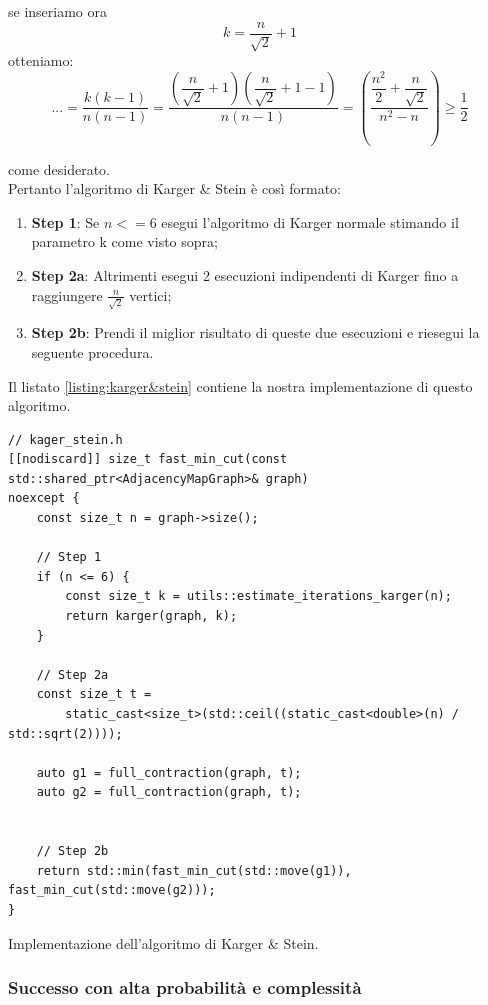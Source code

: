 \noindent se inseriamo ora $$ k = \dfrac{n}{\sqrt{2}} + 1$$ otteniamo:
$$ ... = \dfrac{k(k-1)}{n(n-1)} = \dfrac{(\dfrac{n}{\sqrt{2}} + 1) (\dfrac{n}{\sqrt{2}} + 1 - 1)}{n(n-1)} = (\dfrac{\dfrac{n^2}{2} + \dfrac{n}{\sqrt{2}}}{n^2 - n}) \geq \dfrac{1}{2}$$

\noindent come desiderato.\\

\noindent Pertanto l'algoritmo di Karger \& Stein è così formato:
\begin{enumerate}
    \item \textbf{Step 1}: Se $n <= 6$ esegui l'algoritmo di Karger normale stimando il parametro k come visto sopra;
    \item \textbf{Step 2a}: Altrimenti esegui 2 esecuzioni indipendenti di Karger fino a raggiungere $\frac{n}{\sqrt{2}}$ vertici;
    \item \textbf{Step 2b}: Prendi il miglior risultato di queste due esecuzioni e riesegui la seguente procedura.
\end{enumerate}

Il listato \ref{listing:karger&stein} contiene la nostra implementazione di questo algoritmo.


\begin{listing}[!ht]
\begin{verbatim}
// kager_stein.h
[[nodiscard]] size_t fast_min_cut(const std::shared_ptr<AdjacencyMapGraph>& graph)
noexcept {
    const size_t n = graph->size();

    // Step 1
    if (n <= 6) {
        const size_t k = utils::estimate_iterations_karger(n);
        return karger(graph, k);
    }

    // Step 2a
    const size_t t =
        static_cast<size_t>(std::ceil((static_cast<double>(n) / std::sqrt(2))));

    auto g1 = full_contraction(graph, t);
    auto g2 = full_contraction(graph, t);


    // Step 2b
    return std::min(fast_min_cut(std::move(g1)), fast_min_cut(std::move(g2)));
}
\end{verbatim}
\caption{Implementazione dell'algoritmo di Karger \& Stein.}
\label{listing:karger&stein}
\end{listing}


\subsubsection{Successo con alta probabilità e complessità}
\label{sub:karger-stein-success-whp}

